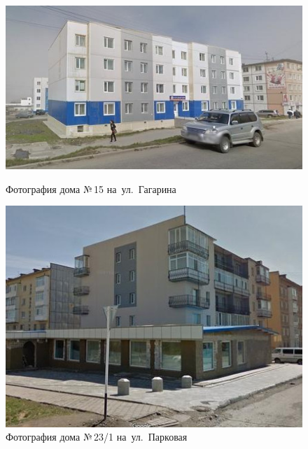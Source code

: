 \begin{figure}[H]
  \begin{center}
    \begin{minipage}[h]{0.545\linewidth}
        \includegraphics[width=1\textwidth]{authors/sydchak-fig-6.jpg}
        \caption{Фотография дома №\,15 на~ул.~Гагарина }
        \label{fig:sydchak-fig-6}
    \end{minipage}
\hfill
    \begin{minipage}[h]{0.4\linewidth}
        \includegraphics[width=1\textwidth]{authors/sydchak-fig-7.jpg}
        \caption{Фотография дома №\,23/1 на~ул.~Парковая }
        \label{fig:sydchak-fig-7}
    \end{minipage}


  \end{center}

\end{figure}
